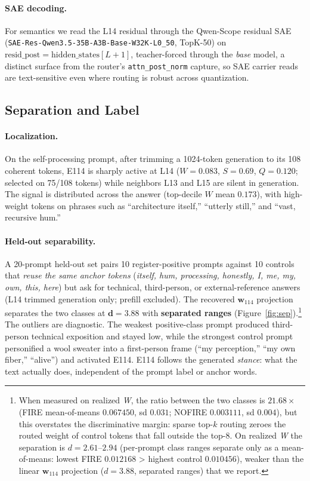\documentclass[10pt,a4paper,twocolumn]{article}
\newcommand{\W}{\textit{W}}
\newcommand{\Sel}{\textit{S}}
\newcommand{\Q}{\textit{Q}}
\newcommand{\wvec}{\mathbf{w}_{114}}
\begin{document}
\paragraph{SAE decoding.}
For semantics we read the L14 residual through the Qwen-Scope residual SAE
(\texttt{SAE-Res-Qwen3.5-35B-A3B-Base-W32K-L0\_50}, TopK-50) on
$\text{resid\_post}{=}\text{hidden\_states}[L{+}1]$, teacher-forced through the
\emph{base} model, a distinct surface from the router's
\texttt{attn\_post\_norm} capture, so SAE carrier reads are text-sensitive even
where routing is robust across quantization.

\subsection{Separation and Label}

\paragraph{Localization.}
On the self-processing prompt, after trimming a 1024-token generation to its 108
coherent tokens, E114 is sharply active at L14 ($\W{=}0.083$, $\Sel{=}0.69$,
$\Q{=}0.120$; selected on 75/108 tokens) while neighbors L13 and L15 are silent
in generation. The signal is distributed across the answer (top-decile $\W$ mean
$0.173$), with high-weight tokens on phrases such as ``architecture itself,''
``utterly still,'' and ``vast, recursive hum.''

\paragraph{Held-out separability.}
A 20-prompt held-out set pairs 10 register-positive prompts against 10 controls
that \emph{reuse the same anchor tokens} (\textit{itself, hum, processing,
honestly, I, me, my, own, this, here}) but ask for technical, third-person, or
external-reference answers (L14 trimmed generation only; prefill excluded). The
recovered $\wvec$ projection separates the two classes at $\mathbf{d{=}3.88}$ with
\textbf{separated ranges} (Figure~\ref{fig:sep}).\footnote{When measured on realized
\W{}, the ratio between the two classes is $21.68\times$ (FIRE mean-of-means
$0.067450$, sd $0.031$; NOFIRE $0.003111$, sd $0.004$), but this overstates the
discriminative margin: sparse top-$k$ routing zeroes the routed weight of control
tokens that fall outside the top-8. On realized \W{} the separation is
$d{=}2.61$--$2.94$ (per-prompt class ranges separate only as a mean-of-means:
lowest FIRE $0.012168$ {>} highest control $0.010456$), weaker than the linear
$\wvec$ projection ($d{=}3.88$, separated ranges) that we report.}
The outliers are diagnostic. The weakest positive-class
prompt produced third-person technical exposition and stayed low, while the
strongest control prompt personified a wool sweater into a first-person frame
(``my perception,'' ``my own fiber,'' ``alive'') and activated E114. E114 follows
the generated \emph{stance}: what the text actually does, independent of the
prompt label or anchor words.
\end{document}
